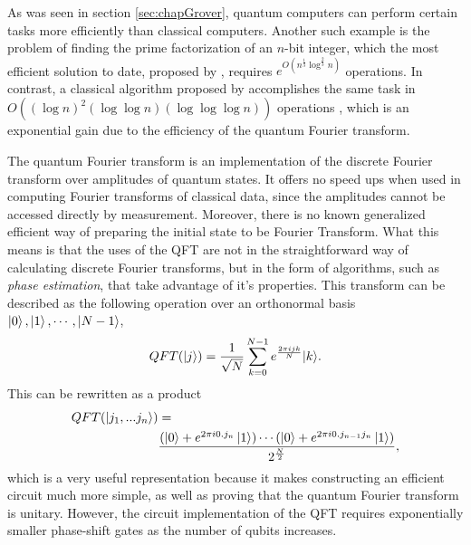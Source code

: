\documentclass[../../dissertation.tex]{subfiles}
\begin{document}
As was seen in section \ref{sec:chapGrover}, quantum computers can perform certain tasks more efficiently than classical computers. Another such example is the problem of finding the prime factorization of an $n$-bit integer, which the most efficient solution to date, proposed by \cite{Pollard93}, requires $e^{O(n^{\frac{1}{3}}\log^{\frac{2}{3}}n)}$ operations. In contrast, a classical algorithm proposed by   accomplishes the same task in $O((\log n)^2 (\log \log n) (\log \log \log n))$ operations , which is an exponential gain due to the efficiency of the quantum Fourier transform.\par
The quantum Fourier transform is an implementation of the discrete Fourier transform over amplitudes of quantum states. It offers no speed ups when used in computing Fourier transforms of classical data, since the amplitudes cannot be accessed directly by measurement. Moreover, there is no known generalized efficient way of preparing the initial state to be Fourier Transform. What this means is that the uses of the QFT are not in the straightforward way of calculating discrete Fourier transforms, but in the form of algorithms, such as \textit{phase estimation}, that take advantage of it's properties. This transform can be described as the following operation over an orthonormal basis $\ket{0}, \ket{1},\cdots,\ket{N-1}$,
\begin{equation}
	QFT(\ket{j}) = \frac{1}{\sqrt{N}} \sum_{k=0}^{N-1} e^{\frac{2\pi i j k}{N}} {\ket{k}}.
\end{equation}
This can be rewritten as a product
\begin{align*}
	QFT(\ket{j_1,...j_n}) & =\\&\frac{(\ket{0} + e^{2 \pi i 0.j_n} \ket{1}) \cdots  (\ket{0} + e^{2 \pi i 0.j_{n-1}j_n} \ket{1})}{2^{\frac{N}{2}}},
\end{align*}
which is a very useful representation because it makes constructing an efficient circuit much more simple, as well as proving that the quantum Fourier transform is unitary. However, the circuit implementation of the QFT requires exponentially smaller phase-shift gates as the number of qubits increases.
\end{document}
